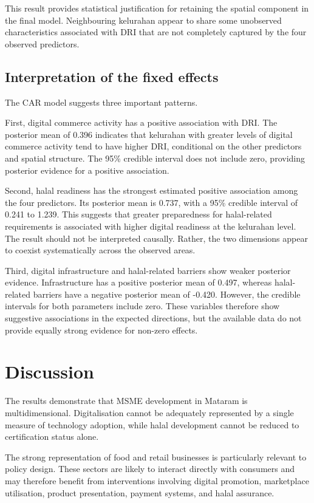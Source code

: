 \documentclass[
  default,
]{sn-jnl}
\begin{document}
This result provides statistical justification for retaining the spatial
component in the final model. Neighbouring kelurahan appear to share
some unobserved characteristics associated with DRI that are not
completely captured by the four observed predictors.

\subsection{Interpretation of the fixed
effects}\label{interpretation-of-the-fixed-effects}

The CAR model suggests three important patterns.

First, digital commerce activity has a positive association with DRI.
The posterior mean of 0.396 indicates that kelurahan with greater levels
of digital commerce activity tend to have higher DRI, conditional on the
other predictors and spatial structure. The 95\% credible interval does
not include zero, providing posterior evidence for a positive
association.

Second, halal readiness has the strongest estimated positive association
among the four predictors. Its posterior mean is 0.737, with a 95\%
credible interval of 0.241 to 1.239. This suggests that greater
preparedness for halal-related requirements is associated with higher
digital readiness at the kelurahan level. The result should not be
interpreted causally. Rather, the two dimensions appear to coexist
systematically across the observed areas.

Third, digital infrastructure and halal-related barriers show weaker
posterior evidence. Infrastructure has a positive posterior mean of
0.497, whereas halal-related barriers have a negative posterior mean of
-0.420. However, the credible intervals for both parameters include
zero. These variables therefore show suggestive associations in the
expected directions, but the available data do not provide equally
strong evidence for non-zero effects.

\section{Discussion}\label{discussion}

The results demonstrate that MSME development in Mataram is
multidimensional. Digitalisation cannot be adequately represented by a
single measure of technology adoption, while halal development cannot be
reduced to certification status alone.

The strong representation of food and retail businesses is particularly
relevant to policy design. These sectors are likely to interact directly
with consumers and may therefore benefit from interventions involving
digital promotion, marketplace utilisation, product presentation,
payment systems, and halal assurance.
\end{document}
